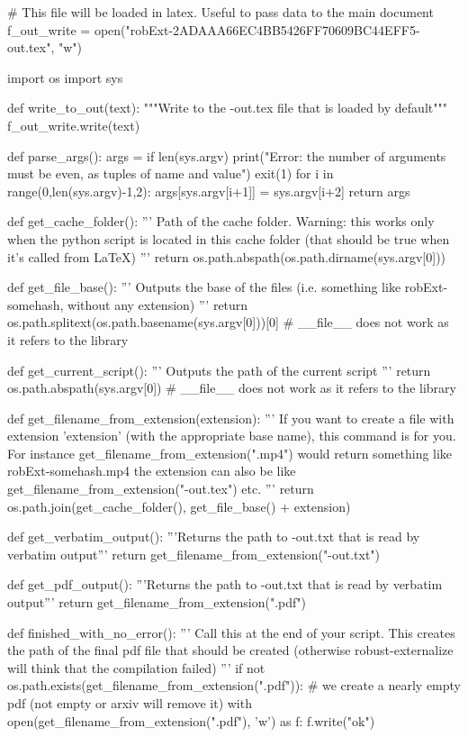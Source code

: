 
# This file will be loaded in latex. Useful to pass data to the main document
f_out_write = open("robExt-2ADAAA66EC4BB5426FF70609BC44EFF5-out.tex", "w")

import os
import sys

def write_to_out(text):
    """Write to the -out.tex file that is loaded by default"""
    f_out_write.write(text)

def parse_args():
    args = {}
    if len(sys.argv) %
        print("Error: the number of arguments must be even, as tuples of name and value")
        exit(1)
    for i in range(0,len(sys.argv)-1,2):
        args[sys.argv[i+1]] = sys.argv[i+2]
    return args

def get_cache_folder():
    '''
    Path of the cache folder. Warning: this works only when the python script
    is located in this cache folder (that should be true when it's called from LaTeX)
    '''
    return os.path.abspath(os.path.dirname(sys.argv[0]))

def get_file_base():
    '''
    Outputs the base of the files (i.e. something like robExt-somehash, without any extension)
    '''
    return os.path.splitext(os.path.basename(sys.argv[0]))[0] # __file__ does not work as it refers to the library

def get_current_script():
    '''
    Outputs the path of the current script
    '''
    return os.path.abspath(sys.argv[0]) # __file__ does not work as it refers to the library


def get_filename_from_extension(extension):
    '''
    If you want to create a file with extension 'extension' (with the appropriate base name), this command
    is for you. For instance get_filename_from_extension(".mp4") would return something like
    robExt-somehash.mp4
    the extension can also be like get_filename_from_extension("-out.tex") etc.
    '''
    return os.path.join(get_cache_folder(), get_file_base() + extension)

def get_verbatim_output():
    '''Returns the path to -out.txt that is read by verbatim output'''
    return get_filename_from_extension("-out.txt")

def get_pdf_output():
    '''Returns the path to -out.txt that is read by verbatim output'''
    return get_filename_from_extension(".pdf")


def finished_with_no_error():
    '''
    Call this at the end of your script. This creates the path of the final pdf file that should be
    created (otherwise robust-externalize will think that the compilation failed)
    '''
    if not os.path.exists(get_filename_from_extension(".pdf")):
        # we create a nearly empty pdf (not empty or arxiv will remove it)
        with open(get_filename_from_extension(".pdf"), 'w') as f:
            f.write("ok")

